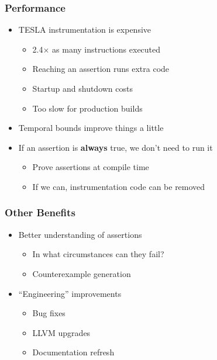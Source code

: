 \documentclass{beamer}
\begin{document}
\begin{frame}
  \frametitle{Performance}

  \begin{itemize}
    \item TESLA instrumentation is expensive
      \begin{itemize}
        \item 2.4$\times$ as many instructions executed
        \item Reaching an assertion runs extra code
        \item Startup and shutdown costs
        \item Too slow for production builds
      \end{itemize}

    \item Temporal bounds improve things a little

    \item If an assertion is \textbf{always} true, we don't need to run it
      \begin{itemize}
        \item Prove assertions at compile time
        \item If we can, instrumentation code can be removed
      \end{itemize}
  \end{itemize}
\end{frame}

\begin{frame}
  \frametitle{Other Benefits}

  \begin{itemize}
    \item Better understanding of assertions
      \begin{itemize}
        \item In what circumstances can they fail?
        \item Counterexample generation
      \end{itemize}

    \item ``Engineering'' improvements
      \begin{itemize}
        \item Bug fixes
        \item LLVM upgrades
        \item Documentation refresh
      \end{itemize}
  \end{itemize}
\end{frame}
\end{document}
